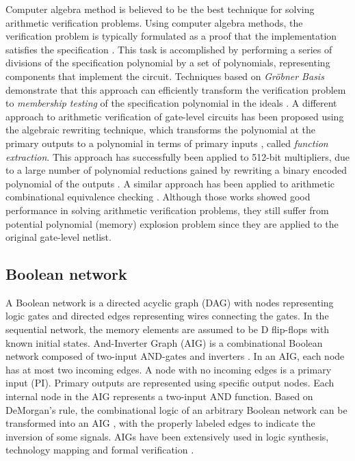 Computer algebra method is believed to be the best technique for solving arithmetic verification problems. Using computer algebra methods, the verification problem is typically formulated as a proof that the implementation satisfies the specification \cite{ciesielski2015verification}\cite{kalla:tcad13}\cite{STABLE:date11}\cite{sayedformal:date-2016}. This task is accomplished by performing a series of divisions of the specification polynomial by a set of polynomials, representing components that implement the circuit. Techniques based on \textit{Gr{\" o}bner Basis} demonstrate that this approach can efficiently transform the verification problem to \textit{membership testing} of the specification polynomial in the ideals \cite{kalla:tcad13}. A different approach to arithmetic verification of gate-level circuits has been proposed using the algebraic rewriting technique, which transforms the polynomial at the primary outputs to a polynomial in terms of primary inputs \cite{ciesielski2015verification}, called \textit{function extraction}. This approach has successfully been applied to 512-bit multipliers, due to a large number of polynomial reductions gained by rewriting a binary encoded polynomial of the outputs \cite{yu:2016-tcad-verification}. A similar approach has been applied to arithmetic combinational equivalence checking \cite{sayedformal:date-2016}. Although those works showed good performance in solving arithmetic verification problems, they still suffer from potential polynomial (memory) explosion problem since they are applied to the original gate-level netlist.


\subsection{Boolean network}
A Boolean network is a directed acyclic graph (DAG) with nodes representing logic gates and directed edges representing wires connecting the gates. In the sequential network, the memory elements are assumed to be D flip-flops with known initial states. And-Inverter Graph (AIG) is a combinational Boolean network composed of two-input AND-gates and inverters \cite{mishchenko:2006-dag}. In an AIG, each node has at most two incoming edges. A node with no incoming edges is a primary input (PI). Primary outputs are represented using specific output nodes. Each internal node in the AIG represents a two-input AND function. Based on DeMorgan's rule, the combinational logic of an arbitrary Boolean network can be transformed into an AIG \cite{abc-link}, with the properly labeled edges to indicate the inversion of some signals. AIGs have been extensively used in logic synthesis, technology mapping \cite{abc-link} and formal verification \cite{mishchenko2005fraigs-verify}.




